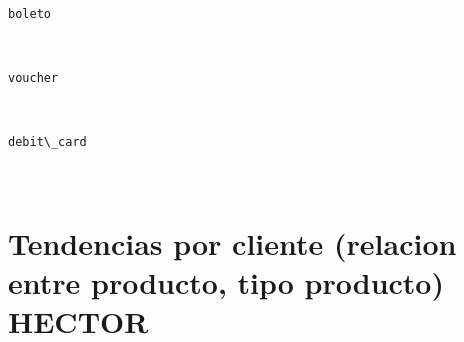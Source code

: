 \documentclass[11pt]{article}
\begin{document}
    \begin{center}
    \end{center}
    { \hspace*{\fill} \\}
    
    \begin{Verbatim}[commandchars=\\\{\}]
boleto

    \end{Verbatim}

    \begin{center}
    \end{center}
    { \hspace*{\fill} \\}
    
    \begin{Verbatim}[commandchars=\\\{\}]
voucher

    \end{Verbatim}

    \begin{center}
    \end{center}
    { \hspace*{\fill} \\}
    
    \begin{Verbatim}[commandchars=\\\{\}]
debit\_card

    \end{Verbatim}

    \begin{center}
    \end{center}
    { \hspace*{\fill} \\}
    
    \hypertarget{tendencias-por-cliente-relacion-entre-producto-tipo-producto-hector}{%
\section{Tendencias por cliente (relacion entre producto, tipo producto)
HECTOR}\label{tendencias-por-cliente-relacion-entre-producto-tipo-producto-hector}}
\end{document}
